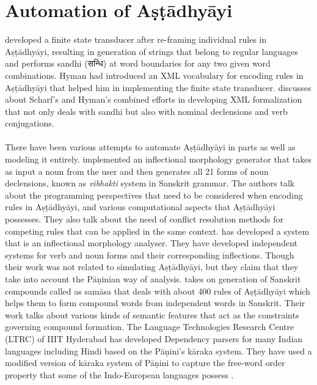 \documentclass[a4paper,11pt,twoside,openright]{report}
\begin{document}
\section{Automation of Aṣṭādhyāyi}
\label{autom}
 developed a finite state transducer after re-framing individual rules in Aṣṭādhyāyi, resulting in generation of strings that belong to regular languages and performs sandhi ({\skt सन्धि}) at word boundaries for any two given word combinations. Hyman had introduced an XML vocabulary for encoding rules in Aṣṭādhyāyi that helped him in implementing the finite state transducer.  discusses about Scharf's and Hyman's combined efforts in developing XML formalization that not only deals with sandhi but also with nominal declensions and verb conjugations. 
\\ \\
There have been various attempts to automate Aṣṭādhyāyi in parts as well as modeling it entirely.   implemented an inflectional morphology generator that takes as input a noun
from the user and then generates all 21 forms of noun declensions, known as \textsl{ vibhakti}
system in Sanskrit grammar. The authors talk about the programming perspectives that need to be
considered when encoding rules in Aṣṭādhyāyi, and various computational aspects that
Aṣṭādhyāyi possesses. They also talk about the need of conflict resolution methods for competing
rules that can be applied in the same context.  has developed a system that is an
inflectional morphology analyser. They have developed independent systems for verb and noun
forms and their corresponding inflections. Though their work was not related to simulating  Aṣṭādhyāyi, but they claim that they take into account the Pāṇinian way of analysis.    takes on generation of Sanskrit compounds called as samāsa that deals with about 400 rules of Aṣṭādhyāyi which helps them to form compound words from independent words in Sanskrit. Their work talks about various kinds of semantic features that act as the constraints governing compound formation. The Language Technologies Research Centre (LTRC) of IIIT Hyderabad has developed Dependency parsers for many Indian languages including Hindi based on the Pāṇini’s kāraka system. They have used a modified version of kāraka system of Pāṇini to capture the free-word order property that some of the Indo-European languages possess \cite{bharati2008two}.
\\ \\
\end{document}
